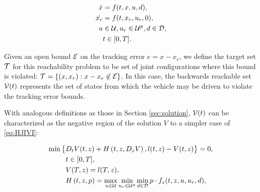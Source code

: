 \begin{equation}
\label{eq:jdyn} %
\begin{aligned}
\dot{x} &= f(t, x, u, d), \\
\dot{x_r} &=f(t,x_r,u_r,0),\\
u &\in \cset, u_r\in\cset^p, d \in \dset, \\
&t \in [0, T].
\end{aligned}
\end{equation}

Given an open bound $\mathcal{E}$ on the tracking error $e=x-x_r$, we define the target set $\mathcal{T}$ for this reachability problem to be set of joint configurations where this bound is violated: $\mathcal{T} = \{(x,x_r): x-x_r\not\in\mathcal{E}\}$. In this case, the backwards reachable set $\mathcal{V}(t)$ represents the set of states from which the vehicle may be driven to violate the tracking error bounds. 




With analogous definitions as those in Section \ref{sec:solution}, $\mathcal{V}(t)$ can be characterized as the negative region of the solution $V$ to a simpler case of \eqref{eq:HJIVI}:

\begin{equation}
\label{eq:HJIVI_track}
\begin{aligned}
\min\big\{&D_t V(t, z) + H\left(t, z, D_z V\right), l(t,z) - V(t, z)\big\}= 0,\\&  t\in[0,T],\\
&V(T, z) = l(T, z),\\
&H\left(t, z, p\right) = \max_{u \in \mathcal{U}} \min_{u_r \in\mathcal{U}^p} \min_{d \in \mathcal{D}} p \cdot f_z(t,z,u,u_r,d),
\end{aligned}
\end{equation}

